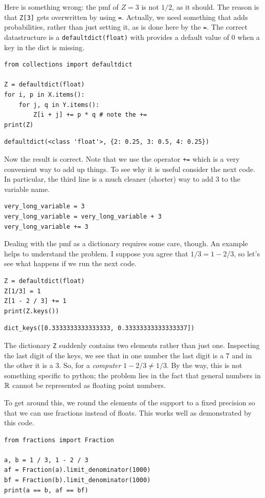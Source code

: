 \documentclass[queueing-book]{subfiles}
\begin{document}
Here is something wrong: the pmf of \(Z=3\) is not \(1/2\), as it should.
The reason is that \texttt{Z[3]} gets overwritten by using \texttt{=}.
Actually, we need something that adds probabilities, rather than just setting it, as is done here by the \texttt{=}.
The correct datastructure is a \texttt{defaultdict(float)} with provides a default value of \(0\) when a key in the dict is missing.
\begin{verbatim}
from collections import defaultdict

Z = defaultdict(float)
for i, p in X.items():
    for j, q in Y.items():
        Z[i + j] += p * q # note the +=
print(Z)
\end{verbatim}

\begin{verbatim}
defaultdict(<class 'float'>, {2: 0.25, 3: 0.5, 4: 0.25})
\end{verbatim}

Now the result is correct.
Note that we use the operator \texttt{+=} which is a very convenient way to add up things.
To see why it is useful consider the next code.
In particular, the third line is a much cleaner (shorter) way to add \(3\) to the variable name.
\begin{verbatim}
very_long_variable = 3
very_long_variable = very_long_variable + 3
very_long_variable += 3
\end{verbatim}

Dealing with the pmf as a dictionary requires some care, though.
An example helps to understand the problem.
I suppose you agree that \(1/3 = 1-2/3\), so let's see what happens if we run the next code.
\begin{verbatim}
Z = defaultdict(float)
Z[1/3] = 1
Z[1 - 2 / 3] += 1
print(Z.keys())
\end{verbatim}

\begin{verbatim}
dict_keys([0.3333333333333333, 0.33333333333333337])
\end{verbatim}

The dictionary \texttt{Z} suddenly contains two elements rather than just one.
Inspecting the last digit of the keys, we see that in one number the last digit is a \(7\) and in the other it is a \(3\).
So, for a \emph{computer} \(1-2/3 \neq 1/3\).
By the way, this is not something specific to python; the problem lies in the fact that general numbers in \(\mathbb{R}\) cannot be represented as floating point numbers.

To get around this, we round the elements of the support to a fixed precision so that we can use fractions instead of floats.
This works well as demonstrated by this code.
\begin{verbatim}
from fractions import Fraction

a, b = 1 / 3, 1 - 2 / 3
af = Fraction(a).limit_denominator(1000)
bf = Fraction(b).limit_denominator(1000)
print(a == b, af == bf)
\end{verbatim}
\end{document}
